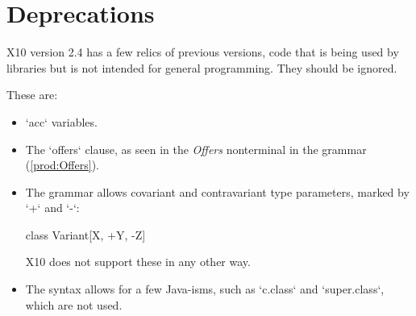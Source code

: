 \chapter{Deprecations}

X10 version 2.4 has a few relics of previous versions, code that is being used
by libraries but is not intended for general programming.    They should be
ignored.

These are: 

\begin{itemize}

\item \xcd`acc` variables. 

\item The \xcd`offers` clause, as seen in the {\it Offers} nonterminal in the
      grammar (\ref{prod:Offers}).

\item The grammar allows covariant and contravariant type parameters, marked
      by \xcd`+` and \xcd`-`: 
\begin{xtenmath}
class Variant[X, +Y, -Z] {}
\end{xtenmath}
      X10 does not support these in any other way.  

\item The syntax allows for a few Java-isms, such as \xcd`c.class` and
      \xcd`super.class`, which are not used.

\end{itemize}
